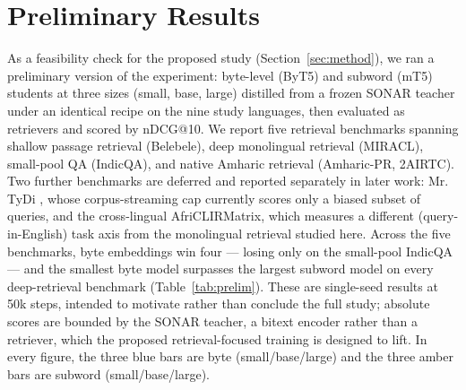 %


\section{Preliminary Results}
\label{sec:prelim}

As a feasibility check for the proposed study (Section~\ref{sec:method}), we ran a preliminary
version of the experiment: byte-level (ByT5) and subword (mT5) students at three sizes (small, base,
large) distilled from a frozen SONAR teacher under an identical recipe on the nine study languages,
then evaluated as retrievers and scored by nDCG@10. We report five retrieval benchmarks spanning
shallow passage retrieval (Belebele), deep monolingual retrieval (MIRACL), small-pool QA (IndicQA),
and native Amharic retrieval (Amharic-PR, 2AIRTC). Two further benchmarks are deferred and reported
separately in later work: Mr.\,TyDi \citep{zhang2021mrtydi}, whose corpus-streaming cap currently
scores only a biased subset of queries, and the cross-lingual AfriCLIRMatrix, which measures a
different (query-in-English) task axis from the monolingual retrieval studied here. Across the five
benchmarks, byte embeddings win four --- losing only on the small-pool IndicQA --- and the smallest
byte model surpasses the largest subword model on every deep-retrieval benchmark
(Table~\ref{tab:prelim}). These are single-seed results at 50k steps, intended to motivate rather than
conclude the full study; absolute scores are bounded by the SONAR teacher, a bitext encoder rather
than a retriever, which the proposed retrieval-focused training is designed to lift. In every figure,
the three blue bars are byte (small/base/large) and the three amber bars are subword
(small/base/large).

